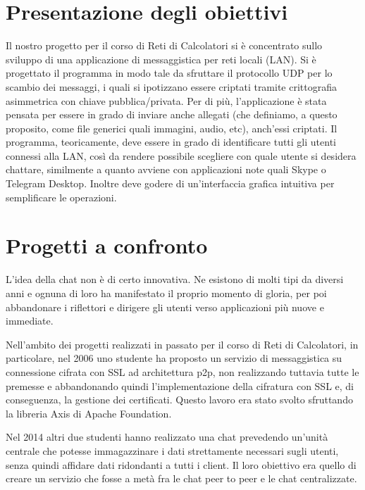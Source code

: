 \section{Presentazione degli obiettivi}
Il nostro progetto per il corso di Reti di Calcolatori si è concentrato sullo sviluppo
di una applicazione di messaggistica per reti locali (LAN).
Si è progettato il programma in modo tale da
sfruttare il protocollo UDP per lo scambio dei messaggi, i quali si ipotizzano essere criptati tramite
crittografia asimmetrica con chiave pubblica/privata. Per di più, l'applicazione
è stata pensata per essere in grado di inviare anche allegati (che definiamo, a questo proposito,
come file generici quali immagini, audio, etc), anch'essi criptati.
Il programma, teoricamente, deve essere in grado di identificare tutti gli utenti connessi
alla LAN, così da rendere possibile scegliere con quale utente si desidera chattare,
similmente a quanto avviene con applicazioni note quali Skype o Telegram Desktop.
Inoltre deve godere di un'interfaccia grafica intuitiva per semplificare
le operazioni.

\section{Progetti a confronto}
L'idea della chat non è di certo innovativa. Ne esistono di molti tipi da diversi anni e
ognuna di loro ha manifestato il proprio momento di gloria, per poi abbandonare i riflettori
e dirigere gli utenti verso applicazioni più nuove e immediate.

Nell'ambito dei progetti realizzati in passato per il corso di Reti di Calcolatori,
in particolare, nel 2006 uno studente ha proposto un servizio di messaggistica su
connessione cifrata con SSL ad architettura p2p, non realizzando tuttavia tutte le premesse
e abbandonando quindi l'implementazione della cifratura con SSL e, di conseguenza,
la gestione dei certificati. Questo lavoro era stato svolto sfruttando la libreria Axis
di Apache Foundation.

Nel 2014 altri due studenti hanno realizzato una chat prevedendo un'unità centrale che
potesse immagazzinare i dati strettamente necessari sugli utenti, senza quindi affidare dati
ridondanti a tutti i client. Il loro obiettivo era quello di creare un servizio che fosse
a metà fra le chat peer to peer e le chat centralizzate.

